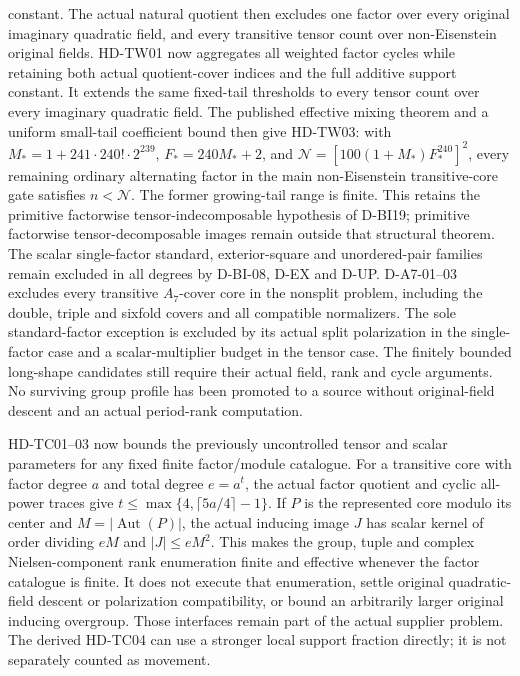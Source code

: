 \documentclass[11pt]{article}
\theoremstyle{remark}\newtheorem{remark}[theorem]{Remark}
\begin{document}
constant. The actual natural quotient then excludes one factor
over every original imaginary quadratic field, and every
transitive tensor count over non-Eisenstein original fields.
HD-TW01 now aggregates all weighted factor cycles while retaining
both actual quotient-cover indices and the full additive support
constant. It extends the same fixed-tail thresholds to every tensor
count over every imaginary quadratic field. The published effective
mixing theorem and a uniform small-tail coefficient bound then give
HD-TW03: with $M_*=1+241\cdot240!\cdot2^{239}$,
$F_*=240M_*+2$, and
$\mathcal N=[100(1+M_*)F_*^{240}]^2$, every remaining ordinary
alternating factor in the main non-Eisenstein transitive-core gate
satisfies $n<\mathcal N$. The former growing-tail range is finite.
This retains the primitive factorwise tensor-indecomposable hypothesis
of D-BI19; primitive factorwise tensor-decomposable images remain outside
that structural theorem.
The scalar single-factor
standard, exterior-square and unordered-pair families remain excluded
in all degrees by D-BI-08, D-EX and D-UP. D-A7-01--03 excludes
every transitive $A_7$-cover core in the nonsplit problem, including
the double, triple and sixfold covers and all compatible normalizers.
The sole standard-factor exception is excluded by its actual split
polarization in the single-factor case and a scalar-multiplier budget
in the tensor case. The finitely bounded long-shape candidates still require their actual
field, rank and cycle arguments. No surviving group profile has been promoted to a source
without original-field descent and an actual period-rank computation.

HD-TC01--03 now bounds the previously uncontrolled tensor and
scalar parameters for any fixed finite factor/module catalogue.
For a transitive core with factor degree $a$ and total degree
$e=a^t$, the actual factor quotient and cyclic all-power traces give
$t\le\max\{4,\lceil5a/4\rceil-1\}$.
If $P$ is the represented core modulo its center and
$M=|\operatorname{Aut}(P)|$, the actual inducing image $J$ has
scalar kernel of order dividing $eM$ and $|J|\le eM^2$.
This makes the group, tuple and complex Nielsen-component rank
enumeration finite and effective whenever the factor catalogue
is finite. It does not execute that enumeration, settle original
quadratic-field descent or polarization compatibility, or bound
an arbitrarily larger original inducing overgroup. Those
interfaces remain part of the actual supplier problem.
The derived HD-TC04 can use a stronger local support fraction directly;
it is not separately counted as movement.
\end{document}
